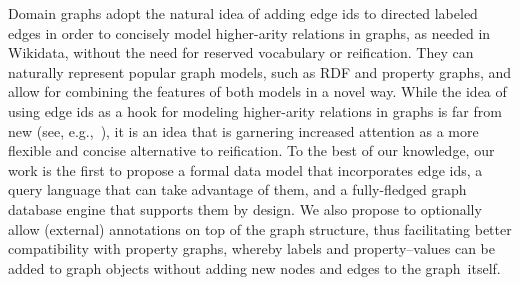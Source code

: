 Domain graphs adopt the natural idea of adding edge ids to directed labeled edges in order to concisely model higher-arity relations in graphs, as needed in Wikidata, without the need for reserved vocabulary or reification. They can naturally represent popular graph models, such as RDF and property graphs, and allow for combining the features of both models in a novel way. While the idea of using edge ids as a hook for modeling higher-arity relations in graphs is far from new (see, e.g.,~\cite{HernandezHK15,IlievskiGCDYRLL20,LassilaSBBBKKLST}), it is an idea that is garnering increased attention as a more flexible and concise alternative to reification.
To the best of our knowledge, our work is the first to propose a formal data model that incorporates edge ids, a query language that can take advantage of them, and a fully-fledged graph database engine that supports them by design. We also propose to optionally allow (external) annotations on top of the graph structure, thus facilitating better compatibility with property graphs, whereby labels and property--values can be added to graph objects without adding new nodes and edges to the graph~itself.

